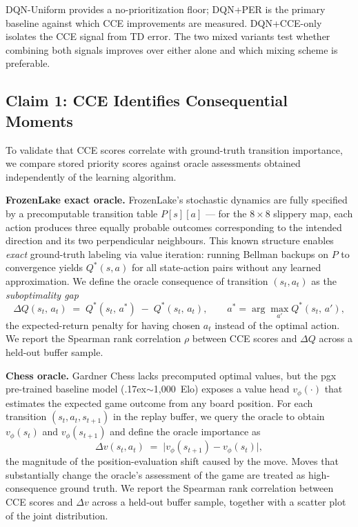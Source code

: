 \documentclass[conference]{IEEEtran}
\begin{document}
\noindent DQN-Uniform provides a no-prioritization floor; DQN+PER is the primary baseline against which CCE improvements are measured. DQN+CCE-only isolates the CCE signal from TD error. The two mixed variants test whether combining both signals improves over either alone and which mixing scheme is preferable.

\subsection{Claim 1: CCE Identifies Consequential Moments}

\noindent To validate that CCE scores correlate with ground-truth transition importance, we compare stored priority scores against oracle assessments obtained independently of the learning algorithm.

\textbf{FrozenLake exact oracle.}
FrozenLake's stochastic dynamics are fully specified by a precomputable transition table $P[s][a]$ — for the $8\times8$ slippery map, each action produces three equally probable outcomes corresponding to the intended direction and its two perpendicular neighbours.
This known structure enables \emph{exact} ground-truth labeling via value iteration: running Bellman backups on $P$ to convergence yields $Q^*(s,a)$ for all state-action pairs without any learned approximation.
We define the oracle consequence of transition $(s_t, a_t)$ as the \emph{suboptimality gap}
\begin{equation}
  \Delta Q(s_t,\, a_t) \;=\; Q^*(s_t,\, a^*) \;-\; Q^*(s_t,\, a_t),
  \qquad a^* = \arg\max_{a'} Q^*(s_t,\, a'),
  \label{eqn:delta_q}
\end{equation}
the expected-return penalty for having chosen $a_t$ instead of the optimal action.
We report the Spearman rank correlation $\rho$ between CCE scores and $\Delta Q$ across a held-out buffer sample.

\textbf{Chess oracle.}
Gardner Chess lacks precomputed optimal values, but the pgx pre-trained baseline model ({\raise.17ex\hbox{$\scriptstyle\sim$}}1{,}000~Elo) exposes a value head $v_\phi(\cdot)$ that estimates the expected game outcome from any board position.
For each transition $(s_t, a_t, s_{t+1})$ in the replay buffer, we query the oracle to obtain $v_\phi(s_t)$ and $v_\phi(s_{t+1})$ and define the oracle importance as
\begin{equation}
  \Delta v(s_t, a_t) \;=\; \bigl|v_\phi(s_{t+1}) - v_\phi(s_t)\bigr|,
  \label{eqn:delta_v}
\end{equation}
the magnitude of the position-evaluation shift caused by the move.
Moves that substantially change the oracle's assessment of the game are treated as high-consequence ground truth.
We report the Spearman rank correlation between CCE scores and $\Delta v$ across a held-out buffer sample, together with a scatter plot of the joint distribution.
\end{document}

